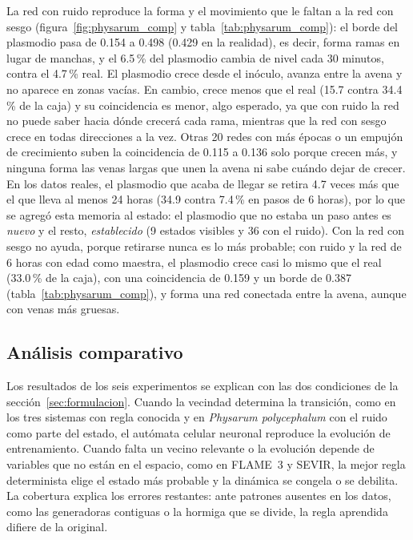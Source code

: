 La red con ruido reproduce la forma y el movimiento que le faltan a la red con sesgo (figura~\ref{fig:physarum_comp} y tabla~\ref{tab:physarum_comp}): el borde del plasmodio pasa de 0.154 a 0.498 (0.429 en la realidad), es decir, forma ramas en lugar de manchas, y el 6.5\,\% del plasmodio cambia de nivel cada 30 minutos, contra el 4.7\,\% real. El plasmodio crece desde el inóculo, avanza entre la avena y no aparece en zonas vacías. En cambio, crece menos que el real (15.7 contra 34.4\,\% de la caja) y su coincidencia es menor, algo esperado, ya que con ruido la red no puede saber hacia dónde crecerá cada rama, mientras que la red con sesgo crece en todas direcciones a la vez. Otras 20 redes con más épocas o un empujón de crecimiento suben la coincidencia de 0.115 a 0.136 solo porque crecen más, y ninguna forma las venas largas que unen la avena ni sabe cuándo dejar de crecer. En los datos reales, el plasmodio que acaba de llegar se retira 4.7 veces más que el que lleva al menos 24 horas (34.9 contra 7.4\,\% en pasos de 6 horas), por lo que se agregó esta memoria al estado: el plasmodio que no estaba un paso antes es \textit{nuevo} y el resto, \textit{establecido} (9 estados visibles y 36 con el ruido). Con la red con sesgo no ayuda, porque retirarse nunca es lo más probable; con ruido y la red de 6 horas con edad como maestra, el plasmodio crece casi lo mismo que el real (33.0\,\% de la caja), con una coincidencia de 0.159 y un borde de 0.387 (tabla~\ref{tab:physarum_comp}), y forma una red conectada entre la avena, aunque con venas más gruesas.

\subsection{Análisis comparativo}

Los resultados de los seis experimentos se explican con las dos condiciones de la sección~\ref{sec:formulacion}. Cuando la vecindad determina la transición, como en los tres sistemas con regla conocida y en \textit{Physarum polycephalum} con el ruido como parte del estado, el autómata celular neuronal reproduce la evolución de entrenamiento. Cuando falta un vecino relevante o la evolución depende de variables que no están en el espacio, como en FLAME~3 y SEVIR, la mejor regla determinista elige el estado más probable y la dinámica se congela o se debilita. La cobertura explica los errores restantes: ante patrones ausentes en los datos, como las generadoras contiguas o la hormiga que se divide, la regla aprendida difiere de la original.
